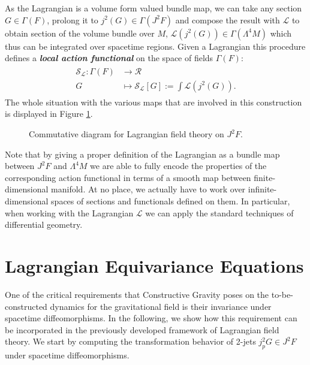 \documentclass[a4paper,12pt, DIV=14, BCOR=5mm, twoside, headsepline, numbers=noenddot]{scrbook}
\begin{document}
As the Lagrangian is a volume form valued bundle map, we can take any section $G \in \Gamma(F)$, prolong it to $j^2(G) \in \Gamma(J^2F)$ and compose the result with $\mathcal{L}$ to obtain section of the volume bundle over $M$, $\mathcal{L}(j^2(G)) \in \Gamma(\Lambda^4M)$ which thus can be integrated over spacetime regions. Given a Lagrangian this procedure defines a \textit{\textbf{local action functional}} on the space of fields $\Gamma(F)$:
\begin{align}
\begin{aligned}
    \mathcal{S}_{\mathcal{L}} : \Gamma(F) &\longrightarrow \mathcal{R} \\
    G &\longmapsto \mathcal{S}_{\mathcal{L}}[G] := \int \mathcal{L}(j^2(G)).
\end{aligned}
\end{align}
The whole situation with the various maps that are involved in this construction is displayed in Figure \ref{diagram1}. 
\begin{figure}[hbt!]
\centering
{}
\caption{Commutative diagram for Lagrangian field theory on $J^2F$.} \label{diagram1}
\end{figure}
Note that by giving a proper definition of the Lagrangian as a bundle map between $J^2F$ and $\Lambda^4M$ we are able to fully encode the properties of the corresponding action functional in terms of a smooth map between finite-dimensional manifold. At no place, we actually have to work over infinite-dimensional spaces of sections and functionals defined on them. In particular, when working with the Lagrangian $\mathcal{L}$ we can apply the standard techniques of differential geometry. 
\section{Lagrangian Equivariance Equations}
One of the critical requirements that Constructive Gravity poses on the to-be-constructed dynamics for the gravitational field is their invariance under spacetime diffeomorphisms. In the following, we show how this requirement can be incorporated in the previously developed framework of Lagrangian field theory. We start by computing the transformation behavior of 2-jets $j_p^2G \in J^2F$ under spacetime diffeomorphisms.
\end{document}
